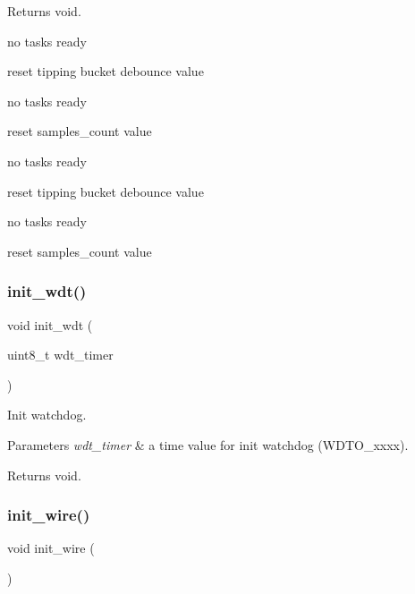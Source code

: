 \begin{DoxyReturn}{Returns}
void. 
\end{DoxyReturn}
no tasks ready

reset tipping bucket debounce value

no tasks ready

reset samples\+\_\+count value

no tasks ready

reset tipping bucket debounce value

no tasks ready

reset samples\+\_\+count value \mbox{\label{i2c-th_8h_a980e73df66b14b1190bc25da430a4f12}} 
\subsubsection{\texorpdfstring{init\+\_\+wdt()}{init\_wdt()}}
{\footnotesize\ttfamily void init\+\_\+wdt (\begin{DoxyParamCaption}\item[{uint8\+\_\+t}]{wdt\+\_\+timer }\end{DoxyParamCaption})}



Init watchdog. 


\begin{DoxyParams}{Parameters}
{\em wdt\+\_\+timer} & a time value for init watchdog (W\+D\+T\+O\+\_\+xxxx). \\
\hline
\end{DoxyParams}
\begin{DoxyReturn}{Returns}
void. 
\end{DoxyReturn}
\mbox{\label{i2c-th_8h_a7c21452937863fa02a29654247eef09b}} 
\subsubsection{\texorpdfstring{init\+\_\+wire()}{init\_wire()}}
{\footnotesize\ttfamily void init\+\_\+wire (\begin{DoxyParamCaption}{ }\end{DoxyParamCaption})}



